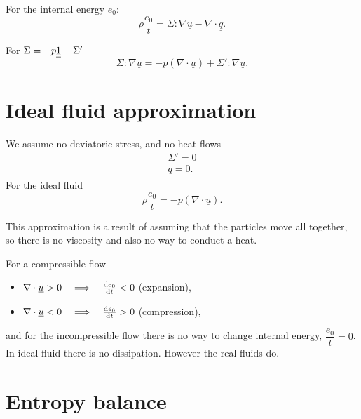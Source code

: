 \documentclass[11pt,oneside]{book}
\renewcommand{\vec}[1]{\underline{#1}}
\theoremstyle{definition} %
\theoremstyle{plain} %
\theoremstyle{remark} %
\theoremstyle{underline}
\begin{document}
  For the internal energy $e_0$:
  \begin{displaymath}
    \rho \dfrac{e_0}{t} = \Sigma : \nabla \vec u - \nabla \cdot \vec q.
  \end{displaymath}
  
  For $\Sigma = - p \underline{\underline{1}} + \Sigma'$
  \begin{displaymath}
    \Sigma : \nabla \vec u = - p ( \nabla \cdot \vec u) + \Sigma' : \nabla \vec u.
  \end{displaymath}
  
  \section{Ideal fluid approximation}

  We assume no deviatoric stress, and no heat flows
  \begin{align*}
    \Sigma' = 0 \\
    \vec q = 0.
  \end{align*}
  For the ideal fluid
  \begin{displaymath}
    \rho \dfrac{e_0}{t} = - p ( \nabla \cdot \vec u).
  \end{displaymath}

  This approximation is a result of assuming that the particles move all together, 
  so there is no viscosity and also no way to conduct a heat.
  
  For a compressible flow
  \begin{itemize}
    \item $\nabla \cdot \vec u > 0 \qLRa \dfrac{e_0}{t} < 0 $ (expansion),
    \item $\nabla \cdot \vec u < 0 \qLRa \dfrac{e_0}{t} > 0 $ (compression),
  \end{itemize}
  and for the incompressible flow there is no way to change internal energy, $\dfrac{e_0}{t} = 0$.
  In ideal fluid there is no dissipation.
  However the real fluids do.

  \section{Entropy balance} 
  \begin{figure}[h]
    \centering
  \end{figure}
  
\end{document}
